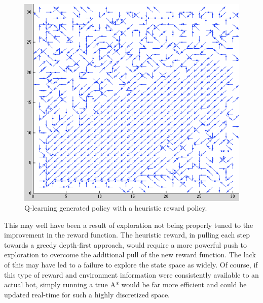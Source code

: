 \documentclass{aiaa-tc}%
\begin{document}
\begin{figure}[htbp]
  \centering
  \includegraphics[width=\linewidth]{images/HeuristicPolicy.png} 
  \caption{Q-learning generated policy with a heuristic reward policy.}
  \label{fig:heuristicQ}
\end{figure}
\clearpage
\noindent
This may well have been a result of exploration
not being properly tuned to the improvement in the reward
function. The heuristic reward, in pulling each step towards a greedy
depth-first approach, would require a more powerful push to exploration
to overcome the additional pull of the new reward function. The lack
of this may have led to a failure to explore
the state space as widely. Of course, if this type
of reward and environment information were consistently available to an actual bot,
simply
running a true A* would be far more
efficient and could be updated real-time for such a highly discretized
space.
\end{document}
